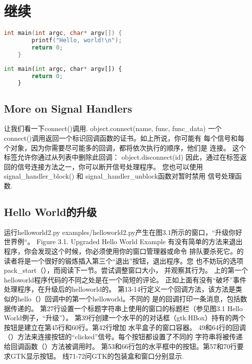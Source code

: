 \chapter{继续}
\begin{lstlisting}[language=C]
	int main(int argc, char* argv[]) {
		printf("Hello, world!\n");
		return 0;
	}
\end{lstlisting}
\begin{lstlisting}[language=Python]
	int main(int argc, char* argv[]) {
		return 0;
	}
\end{lstlisting}
	\section{More on Signal Handlers}
让我们看一下connect()调用.
object.connect(name, func, func\_data)
一个connect()调用返回一个标识回调函数的证书。如上所说，你可能有
每个信号和每个对象，因为你需要尽可能多的回调，都将依次执行的顺序，他们是
连接。
这个标签允许你通过从列表中删除此回调：
object.disconnect(id)
因此，通过在标签返回的信号连接方法之一，你可以断开信号处理程序。
您也可以使用signal\_handler\_block() 和 signal\_handler\_unblock函数对暂时禁用
信号处理函数.
	\section{Hello World的升级}
运行helloworld2.py examples/helloworld2.py产生在图3.1所示的窗口，“升级你好
世界例“。
Figure 3.1. Upgraded Hello World Example
有没有简单的方法来退出程序，你会发现这个时候，你必须使用你的窗口管理器或命令
排队要杀死它。的读者将是一个很好的锻炼插入第三个“退出”按钮，退出程序。您
也不妨玩的选项pack\_start（），而阅读下一节。尝试调整窗口大小，
并观察其行为。
上的第一个helloworld程序代码的不同之处是在一个简短的评论。
正如上面有没有“破坏”事件处理程序，在升级后的helloworld的。
第13-14行定义一个回调方法，该方法是类似的hello（）回调中的第一个helloworld。不同的
是的回调打印一条消息，包括数据传递的。
第27行设置一个标题字符串上使用的窗口的标题栏（参见图3.1 Hello World例子，“升级”）。
第39行创建一个水平的的对话框（gtk.HBox）持有的两个按钮是建立在第45行和60行。第42行增加
水平盒子的窗口容器。
49和64行的回调（）方法来连接按钮的“clicked”信号。每个按钮都设置了不同的
字符串将被传递给回调函数（）方法被调用时。
第53和66行包的水平框中的按钮。第57和70行要求GTK显示按钮。
线71-72问GTK的包装盒和窗口分别显示.
